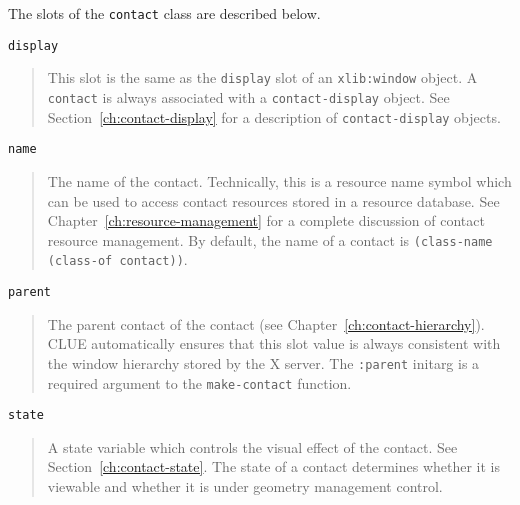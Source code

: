 The slots of the {\tt contact} class are described below.

\begin{flushright} \parbox[t]{6.125in}{
{\tt display}
\begin{quote}
This slot is the same as the {\tt display} slot of an {\tt xlib:window} object.
A {\tt contact} is
always associated with a {\tt contact-display} object.
See Section~\ref{ch:contact-display} for a
description of {\tt contact-display} objects.\end{quote}

}\end{flushright}

\begin{flushright} \parbox[t]{6.125in}{
{\tt name}
\begin{quote}
The name of the contact. Technically, this is
a resource name symbol which can be used to access contact resources
stored in a resource database. See Chapter~\ref{ch:resource-management}
for a complete discussion of contact resource management. 
By default, the name of a contact is {\tt (class-name (class-of contact))}.
\end{quote}

}\end{flushright}

\begin{flushright} \parbox[t]{6.125in}{
{\tt parent}
\begin{quote}
The  parent contact of the contact (see Chapter~\ref{ch:contact-hierarchy}). 
CLUE automatically ensures that this slot value is always consistent with the
window hierarchy stored by the X server.
The {\tt :parent} initarg is a required argument to the {\tt make-contact}
function.
\end{quote}

}\end{flushright}

\begin{flushright} \parbox[t]{6.125in}{
{\tt state}
\begin{quote}
A state variable which controls the visual effect of the contact. See
Section~\ref{ch:contact-state}. The state
of a contact determines whether it is viewable and whether it is under geometry
management control.
\end{quote}

}\end{flushright}


